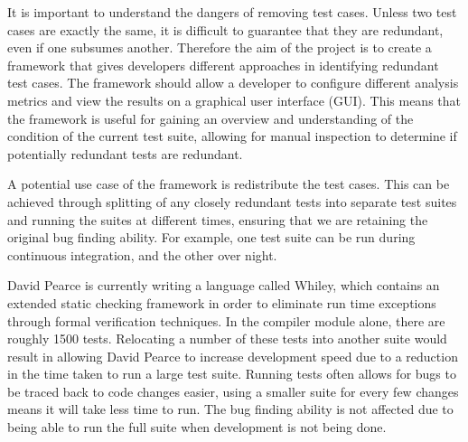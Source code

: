 It is important to understand the dangers of removing test cases. Unless two test cases are exactly the same, it is difficult to guarantee that they are redundant, even if one subsumes another. Therefore the aim of the project is to create a framework that gives developers different approaches in identifying redundant test cases. The framework should allow a developer to configure different analysis metrics and view the results on a graphical user interface (GUI). This means that the framework is useful for gaining an overview and understanding of the condition of the current test suite, allowing for manual inspection to determine if potentially redundant tests are redundant.

A potential use case of the framework is redistribute the test cases. This can be achieved through splitting of any closely redundant tests into separate test suites and running the suites at different times, ensuring that we are retaining the original bug finding ability. For example, one test suite can be run during continuous integration, and the other over night.

David Pearce is currently writing a language called Whiley, which contains an extended static checking framework in order to eliminate run time exceptions through formal verification techniques. In the compiler module alone, there are roughly 1500 tests. Relocating a number of these tests into another suite would result in allowing David Pearce to increase development speed due to a reduction in the time taken to run a large test suite. Running tests often allows for bugs to be traced back to code changes easier, using a smaller suite for every few changes means it will take less time to run. The bug finding ability is not affected due to being able to run the full suite when development is not being done. 